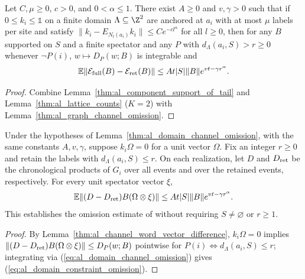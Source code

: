 \begin{lemma}
    \label{thm:al_domain_channel_omission}
    \leanok
    Let $C,\mu\ge0$, $c>0$, and $0<\alpha\le1$. There exist $A\ge0$ and
    $v,\gamma>0$ such that if $0\le k_i\le\mathbb 1$ on a finite domain
    $\Lambda\subseteq\Z^2$ are anchored at $a_i$ with at most $\mu$ labels per
    site and satisfy $\|k_i-E_{N_l(a_i)}k_i\|\le Ce^{-cl^\alpha}$ for all
    $l\ge0$, then for any $B$ supported on $S$ and a finite spectator and any
    $P$ with $d_\Lambda(a_i,S)>r\ge0$ whenever $\neg P(i)$, $w\mapsto D_P(w;B)$
    is integrable and
    \begin{align}
        \mathbb E\|\mathcal E_{\rm full}(B)-\mathcal E_{\rm ret}(B)\|
        \le At|S|\|B\|e^{vt-\gamma r^\alpha}.
        \label{eq:al_domain_channel_omission}
    \end{align}
\end{lemma}
\begin{proof}\leanok
    Combine Lemma~\ref{thm:al_component_support_of_tail} and
    Lemma~\ref{thm:al_lattice_counts} ($K=2$) with
    Lemma~\ref{thm:al_graph_channel_omission}.
\end{proof}

\begin{lemma}
    \label{thm:al_domain_constraint_omission}
    \leanok
    Under the hypotheses of Lemma~\ref{thm:al_domain_channel_omission}, with
    the same constants $A,v,\gamma$, suppose $k_i\Omega=0$ for a unit vector
    $\Omega$. Fix an integer $r\ge0$ and retain the labels with
    $d_\Lambda(a_i,S)\le r$. On each realization, let $D$ and $D_{\rm ret}$ be
    the chronological products of $G_i$ over all events and over the retained
    events, respectively. For every unit spectator vector $\xi$,
    \begin{align}
        \mathbb E\|(D-D_{\rm ret})B(\Omega\otimes\xi)\|
        \le At|S|\|B\|e^{vt-\gamma r^\alpha}.
        \label{eq:al_domain_constraint_omission}
    \end{align}
    This establishes the omission estimate of \cite[Lemma~10.1]{OpenAI2026AreaLaw}
    without requiring $S\ne\varnothing$ or $r\ge1$.
\end{lemma}
\begin{proof}\leanok
    By Lemma~\ref{thm:al_channel_word_vector_difference}, $k_i\Omega=0$
    implies $\|(D-D_{\rm ret})B(\Omega\otimes\xi)\|\le D_P(w;B)$ pointwise for
    $P(i)\iff d_\Lambda(a_i,S)\le r$; integrating via
    (\ref{eq:al_domain_channel_omission}) gives
    (\ref{eq:al_domain_constraint_omission}).
\end{proof}

